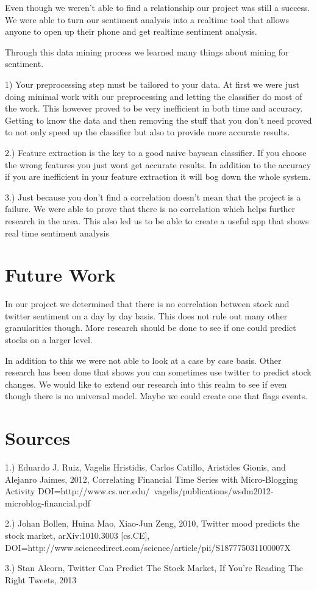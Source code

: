 \documentclass{acm_proc_article-sp}
\begin{document}
Even though we weren't able to find a relationship our project was still a success.
We were able to turn our sentiment analysis into a realtime tool that allows anyone
to open up their phone and get realtime sentiment analysis. 

Through this data mining process we learned many things about mining for sentiment.

1) Your preprocessing step must be tailored to your data. At first we were just doing
minimal work with our preprocessing and letting the classifier do most of the work. 
This however proved to be very inefficient in both time and accuracy. Getting to know
the data and then removing the stuff that you don't need proved to not only speed 
up the classifier but also to provide more accurate results.

2.) Feature extraction is the key to a good naive baysean classifier. If you choose
the wrong features you just wont get accurate results. In addition to the accuracy
if you are inefficient in your feature extraction it will bog down the whole system. 

3.) Just because you don't find a correlation doesn't mean that the project is a failure.
We were able to prove that there is no correlation which helps further research in 
the area. This also led us to be able to create a useful app that shows real time 
sentiment analysis

\section{Future Work}

In our project we determined that there is no correlation between stock and twitter 
sentiment on a day by day basis. This does not rule out many other granularities though.
More research should be done to see if one could predict stocks on a larger level. 

In addition to this we were not able to look at a case by case basis. Other research 
has been done that shows you can sometimes use twitter to predict stock changes. 
We would like to extend our research into this realm to see if even though there is no 
universal model. Maybe we could create one that flags events. 

\section{Sources}

1.) Eduardo J. Ruiz, Vagelis Hristidis, Carlos Catillo, Aristides Gionis, and
Alejanro Jaimes,  2012, Correlating Financial Time Series with Micro-Blogging
Activity DOI=http://www.cs.ucr.edu/~vagelis/publications/wsdm2012-microblog-financial.pdf 

2.) Johan Bollen, Huina Mao, Xiao-Jun Zeng, 2010, Twitter mood predicts the stock
market, arXiv:1010.3003 [cs.CE], DOI=http://www.sciencedirect.com/science/article/pii/S187775031100007X


3.) Stan Alcorn, Twitter Can Predict The Stock Market, If You're Reading The Right
Tweets, 2013

 
\end{document}
